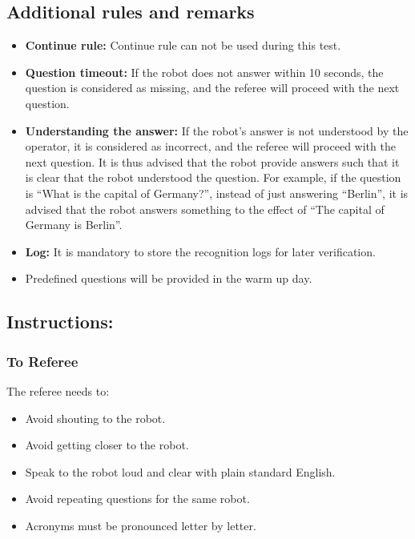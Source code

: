 \subsection*{Additional rules and remarks}
\begin{itemize}[nosep]
	\item \textbf{Continue rule:} Continue rule can not be used during this test.
	\item \textbf{Question timeout:} If the robot does not answer within 10 seconds, the question is considered as missing, and the referee will proceed with the next question.
	\item \textbf{Understanding the answer:} If the robot’s answer is not understood by the operator, it is considered as incorrect, and the referee will proceed with the next question. It is thus advised that the robot provide answers such that it is clear that the robot understood the question. For example, if the question is “What is the capital of Germany?”, instead of just answering “Berlin”, it is advised that the robot answers something to the effect of “The capital of Germany is Berlin”.
	\item \textbf{Log:} It is mandatory to store the recognition logs for later verification.
	\item Predefined questions will be provided in the warm up day.
\end{itemize}

\subsection*{Instructions:}
\subsubsection*{To Referee}

The referee needs to:
\begin{itemize}
	\item Avoid shouting to the robot.
	\item Avoid getting closer to the robot.
	\item Speak to the robot loud and clear with plain standard English.
	\item Avoid repeating questions for the same robot. 
	\item Acronyms must be pronounced letter by letter.
\end{itemize}


